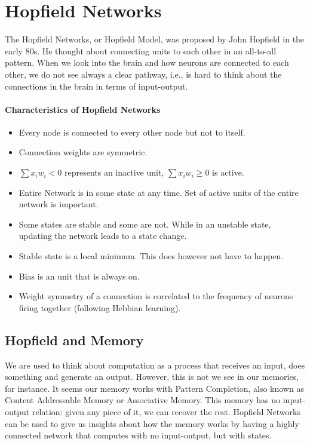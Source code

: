 \documentclass[main]{subfiles}
\begin{document}

\section{Hopfield Networks}

The Hopfield Networks, or Hopfield Model, was proposed by John Hopfield in the early 80s.
He thought about connecting units to each other in an all-to-all pattern.
When we look into the brain and how neurons are connected to each other, we do not see always a clear pathway, i.e., is hard to think about the connections in the brain in terms of input-output.

\paragraph{Characteristics of Hopfield Networks}
\begin{itemize}[noitemsep,nolistsep]
	\item Every node is connected to every other node but not to itself.
	\item Connection weights are symmetric.
	\item $\sum x_i w_i < 0$ represents an inactive unit, $\sum x_i w_i \geq 0$ is active.
	\item Entire Network is in some state at any time. Set of active units of the entire network is important.
	\item Some states are stable and some are not. While in an unstable state, updating the network leads to a state change.
	\item Stable state is a local minimum. This does however not have to happen.
	\item Bias is an unit that is always on.
	\item Weight symmetry of a connection is correlated to the frequency of neurons firing together (following Hebbian learning).
\end{itemize}

\subsection{Hopfield and Memory}

We are used to think about computation as a process that receives an input, does something and generate an output.
However, this is not we see in our memories, for instance.
It seems our memory works with Pattern Completion, also known as Content Addressable Memory or Associative Memory.
This memory has no input-output relation: given any piece of it, we can recover the rest.
Hopfield Networks can be used to give us insights about how the memory works by having a highly connected network that computes with no input-output, but with states.
\end{document}
